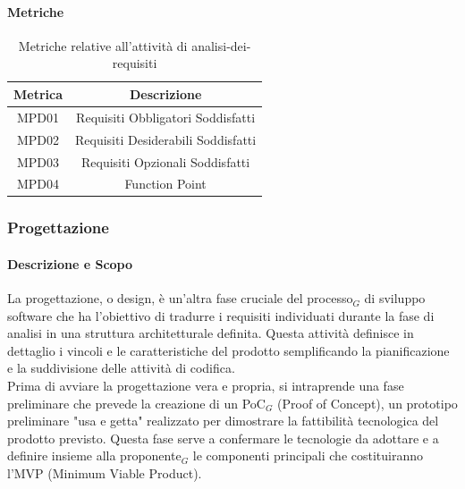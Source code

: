 \documentclass[10pt]{article}
\begin{document}
\begin{justify}
        \paragraph{Metriche}
        \begin{table}[H]
          \centering
          \begin{tabular}{|c|c|}
            \hline
            \textbf{Metrica} & \textbf{Descrizione} \\
            \hline
            MPD01 & Requisiti Obbligatori Soddisfatti\\
            \hline
            MPD02 & Requisiti Desiderabili Soddisfatti\\
            \hline
            MPD03 & Requisiti Opzionali Soddisfatti\\
            \hline
            MPD04 & Function Point\\
            \hline
          \end{tabular}
          \caption{Metriche relative all'attività di analisi-dei-requisiti}
        \end{table}

    \subsubsection{Progettazione}
    \label{progettazione}
        \paragraph{Descrizione e Scopo}
        La progettazione, o design, è un'altra fase cruciale del processo$_G$ di sviluppo software che ha l'obiettivo di tradurre i requisiti individuati durante la fase di analisi in una struttura architetturale definita. Questa attività definisce in dettaglio i vincoli e le caratteristiche del prodotto semplificando la pianificazione e la suddivisione delle attività di codifica.\\
        Prima di avviare la progettazione vera e propria, si intraprende una fase preliminare che prevede la creazione di un PoC$_G$ (Proof of Concept), un prototipo preliminare "usa e getta" realizzato per dimostrare la fattibilità tecnologica del prodotto previsto. Questa fase serve a confermare le tecnologie da adottare e a definire insieme alla proponente$_G$ le componenti principali che costituiranno l'MVP (Minimum Viable Product).\\


\end{justify}
\end{document}
